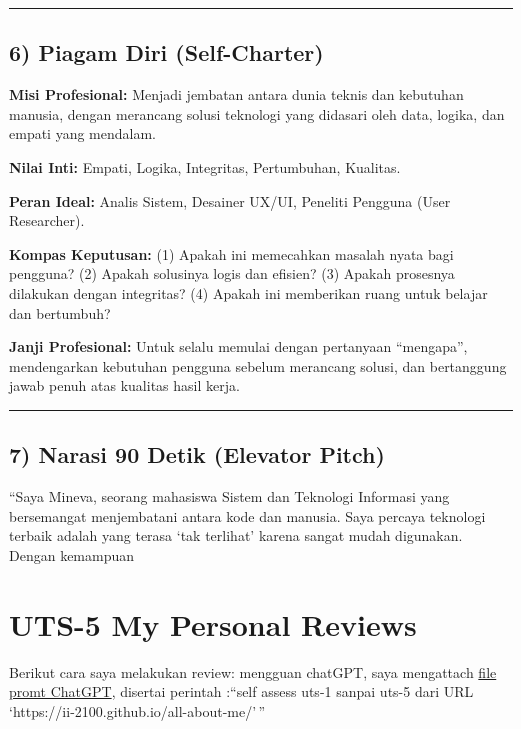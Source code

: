 \documentclass[
  letterpaper,
  DIV=11,
  numbers=noendperiod]{scrreprt}
\begin{document}
\begin{center}\rule{0.5\linewidth}{0.5pt}\end{center}

\section{6) Piagam Diri (Self-Charter)}\label{piagam-diri-self-charter}

\textbf{Misi Profesional:} Menjadi jembatan antara dunia teknis dan
kebutuhan manusia, dengan merancang solusi teknologi yang didasari oleh
data, logika, dan empati yang mendalam.

\textbf{Nilai Inti:} Empati, Logika, Integritas, Pertumbuhan, Kualitas.

\textbf{Peran Ideal:} Analis Sistem, Desainer UX/UI, Peneliti Pengguna
(User Researcher).

\textbf{Kompas Keputusan:} (1) Apakah ini memecahkan masalah nyata bagi
pengguna? (2) Apakah solusinya logis dan efisien? (3) Apakah prosesnya
dilakukan dengan integritas? (4) Apakah ini memberikan ruang untuk
belajar dan bertumbuh?

\textbf{Janji Profesional:} Untuk selalu memulai dengan pertanyaan
``mengapa'', mendengarkan kebutuhan pengguna sebelum merancang solusi,
dan bertanggung jawab penuh atas kualitas hasil kerja.

\begin{center}\rule{0.5\linewidth}{0.5pt}\end{center}

\section{7) Narasi 90 Detik (Elevator
Pitch)}\label{narasi-90-detik-elevator-pitch}

``Saya Mineva, seorang mahasiswa Sistem dan Teknologi Informasi yang
bersemangat menjembatani antara kode dan manusia. Saya percaya teknologi
terbaik adalah yang terasa `tak terlihat' karena sangat mudah digunakan.
Dengan kemampuan


\chapter{UTS-5 My Personal Reviews}\label{uts-5-my-personal-reviews}

Berikut cara saya melakukan review: mengguan chatGPT, saya mengattach
\href{skor_uts.pdf}{file promt ChatGPT}, disertai perintah :``self
assess uts-1 sanpai uts-5 dari URL
`https://ii-2100.github.io/all-about-me/'\,''
\end{document}
